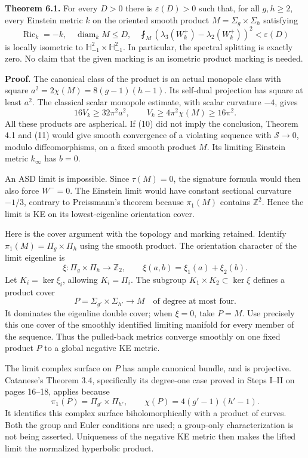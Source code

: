 \documentclass[
  11pt,
]{article}
\begin{document}
\textbf{Theorem 6.1.} For every \(D>0\) there is \(\varepsilon(D)>0\)
such that, for all \(g,h\ge2\), every Einstein metric \(k\) on the
oriented smooth product \(M=\Sigma_g\times\Sigma_h\) satisfying \[
 \operatorname{Ric}_k=-k,\quad \operatorname{diam}_kM\le D,
 \quad\fint_M(\lambda_3(W_k^+)-\lambda_2(W_k^+))^2
       <\varepsilon(D)                                    \tag{10}
\] is locally isometric to \(\mathbb H^2_{-1}\times\mathbb H^2_{-1}\).
In particular, the spectral splitting is exactly zero. No claim that the
given marking is an isometric product marking is needed.

\textbf{Proof.} The canonical class of the product is an actual monopole
class with square \(a^2=2\chi(M)=8(g-1)(h-1)\). Its self-dual projection
has square at least \(a^2\). The classical scalar monopole estimate,
with scalar curvature \(-4\), gives \[
 16V_k\ge32\pi^2a^2,\qquad
                  V_k\ge4\pi^2\chi(M)\ge16\pi^2.          \tag{11}
\] All these products are aspherical. If (10) did not imply the
conclusion, Theorem 4.1 and (11) would give smooth convergence of a
violating sequence with \(\mathscr S\to0\), modulo diffeomorphisms, on a
fixed smooth product \(M\). Its limiting Einstein metric \(k_\infty\)
has \(b=0\).

An ASD limit is impossible. Since \(\tau(M)=0\), the signature formula
would then also force \(W^-=0\). The Einstein limit would have constant
sectional curvature \(-1/3\), contrary to Preissmann's theorem because
\(\pi_1(M)\) contains \(\mathbb Z^2\). Hence the limit is KE on its
lowest-eigenline orientation cover.

Here is the cover argument with the topology and marking retained.
Identify \(\pi_1(M)=\Pi_g\times\Pi_h\) using the smooth product. The
orientation character of the limit eigenline is \[
 \xi:\Pi_g\times\Pi_h\longrightarrow\mathbb Z_2,
 \qquad \xi(a,b)=\xi_1(a)+\xi_2(b).
\] Let \(K_i=\ker\xi_i\), allowing \(K_i=\Pi_i\). The subgroup
\(K_1\times K_2\subset\ker\xi\) defines a product cover \[
 P=\Sigma_{g'}\times\Sigma_{h'}\longrightarrow M
                      \quad\text{of degree at most four}. \tag{12}
\] It dominates the eigenline double cover; when \(\xi=0\), take
\(P=M\). Use precisely this one cover of the smoothly identified
limiting manifold for every member of the sequence. Thus the pulled-back
metrics converge smoothly on one fixed product \(P\) to a global
negative KE metric.

The limit complex surface on \(P\) has ample canonical bundle, and is
projective. Catanese's Theorem 3.4, specifically its degree-one case
proved in Steps I--II on pages 16--18, applies because \[
 \pi_1(P)=\Pi_{g'}\times\Pi_{h'},\qquad
 \chi(P)=4(g'-1)(h'-1).
\] It identifies this complex surface biholomorphically with a product
of curves. Both the group and Euler conditions are used; a group-only
characterization is not being asserted. Uniqueness of the negative KE
metric then makes the lifted limit the normalized hyperbolic product.
\end{document}
